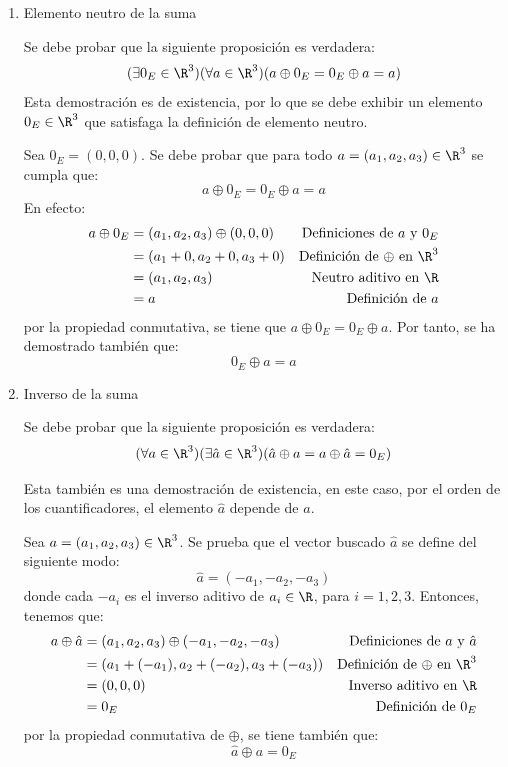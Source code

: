 \documentclass[compacto,10pt]{pubciencias-notas}
\begin{document}
\begin{ejem}
\begin{enumerate}
\item Elemento neutro de la suma
    
Se debe probar que la siguiente proposición es verdadera:
\[(\exists 0_E\in \R^{3})(\forall a\in \R^{3})(a\oplus 0_E=0_E\oplus a=a)\]
Esta demostración es de existencia, por lo que se debe exhibir un elemento $0_E\in \R^{3}$ que satisfaga la definición de elemento neutro.\newline

Sea $0_E=(0,0,0)$. Se debe probar que para todo $a=(a_1,a_2,a_3)\in \R^{3}$ se cumpla que:
\[a\oplus 0_E = 0_E \oplus a = a\]
En efecto:
\begin{align*}
    a \oplus 0_E &= (a_1, a_2, a_3) \oplus (0,0,0) & \text{Definiciones de $a$ y $0_E$}\\
    &= (a_1+0,a_2+0, a_3+0) & \text{Definición de $\oplus$ en $\R^{3}$}\\
    &= (a_1,a_2,a_3) & \text{Neutro aditivo en $\R$}\\
    &= a & \text{Definición de $a$}
\end{align*}
por la propiedad conmutativa, se tiene que $a\oplus 0_E= 0_E\oplus a$. Por tanto, se ha demostrado también que:
\[0_E \oplus a = a\]
    
\item Inverso de la suma
    
Se debe probar que la siguiente proposición es verdadera:
\[(\forall a\in \R^{3})(\exists \hat{a}\in \R^{3})(\hat{a}\oplus a=a\oplus \hat{a}=0_E)\]

Esta también es una demostración de existencia, en este caso, por el orden de los cuantificadores, el elemento $\hat{a}$ depende de $a$.\newline

Sea $a=(a_1,a_2,a_3)\in \R^{3}$. Se prueba que el vector buscado $\hat{a}$ se define del siguiente modo:
\[\hat{a}=(-a_1, -a_2, -a_3)\]
donde cada $-a_i$ es el inverso aditivo de $a_i\in \R$, para $i=1,2,3$.\newline
Entonces, tenemos que:
\begin{align*}
    a\oplus \hat{a} &= (a_1, a_2, a_3) \oplus (-a_1, -a_2, -a_3) & \text{Definiciones de $a$ y $\hat{a}$}\\
    &= (a_1+(-a_1), a_2+(-a_2), a_3+(-a_3)) & \text{Definición de $\oplus$ en $\R^{3}$}\\
    &= (0,0,0) & \text{Inverso aditivo en $\R$}\\
    &= 0_E & \text{Definición de $0_E$}
\end{align*}
por la propiedad conmutativa de $\oplus$, se tiene también que:
\[\hat{a} \oplus a = 0_E\]
    

\end{enumerate}
\end{ejem}
\end{document}
